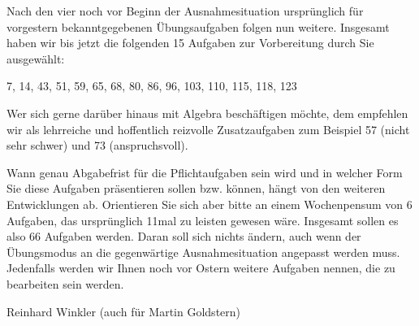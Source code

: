 Nach den vier noch vor Beginn der Ausnahmesituation ursprünglich für vorgestern bekanntgegebenen Übungsaufgaben folgen nun weitere. Insgesamt haben wir bis jetzt die folgenden 15 Aufgaben zur Vorbereitung durch Sie ausgewählt:

7, 14, 43, 51, 59, 65, 68, 80, 86, 96, 103, 110, 115, 118, 123

Wer sich gerne darüber hinaus mit Algebra beschäftigen möchte, dem empfehlen wir als lehrreiche und hoffentlich reizvolle Zusatzaufgaben zum Beispiel 57 (nicht sehr schwer) und 73 (anspruchsvoll).

Wann genau Abgabefrist für die Pflichtaufgaben sein wird und in welcher Form Sie diese Aufgaben präsentieren sollen bzw. können, hängt von den weiteren Entwicklungen ab. Orientieren Sie sich aber bitte an einem Wochenpensum von 6 Aufgaben, das ursprünglich 11mal zu leisten gewesen wäre. Insgesamt sollen es also 66 Aufgaben werden. Daran soll sich nichts ändern, auch wenn der Übungsmodus an die gegenwärtige Ausnahmesituation angepasst werden muss. Jedenfalls werden wir Ihnen noch vor Ostern weitere Aufgaben nennen, die zu bearbeiten sein werden.

Reinhard Winkler (auch für Martin Goldstern)
